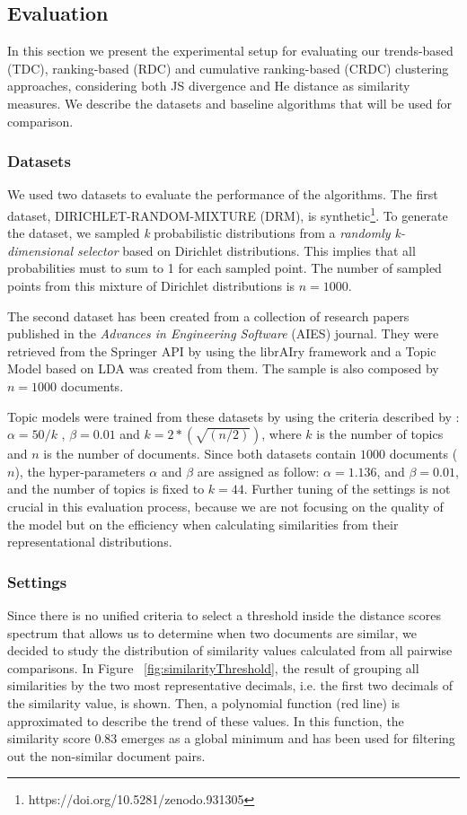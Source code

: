 \subsection{Evaluation}
\label{sec:clustering-experiments}
In this section we present the experimental setup for evaluating our trends-based (TDC), ranking-based (RDC) and cumulative ranking-based (CRDC) clustering approaches, considering both JS divergence and He distance as similarity measures. We describe the datasets and baseline algorithms that will be used for comparison.

\subsubsection{Datasets}
\label{sec:clustering-datasets}
We used two datasets to evaluate the performance of the algorithms. The first dataset, DIRICHLET-RANDOM-MIXTURE (DRM), is synthetic\footnote{https://doi.org/10.5281/zenodo.931305}. To generate the dataset, we sampled \textit{k} probabilistic distributions from a \textit{randomly k-dimensional selector} based on Dirichlet distributions. This implies that all probabilities must to sum to 1 for each sampled point. The number of sampled points from this mixture of Dirichlet distributions is $n=1000$.

The second dataset has been created from a collection of research papers published in the \textit{Advances in Engineering Software} (AIES) journal. They were retrieved from the Springer API by using the librAIry \citep{Badenes-Olmedo2017} framework and a Topic Model based on LDA was created from them. The sample is also composed by $n=1000$ documents.

Topic models were trained from these datasets by using the criteria described by \citep{Steyvers2006}: $\alpha= 50/k$ , $\beta= 0.01$ and $k=2*(\sqrt{(n/2)})$, where $k$ is the number of topics and $n$ is the number of documents. Since both datasets contain $1000$ documents ($n$), the hyper-parameters $\alpha$ and $\beta$ are assigned as follow: $\alpha=1.136$, and $\beta=0.01$, and the number of topics is fixed to $k=44$. Further tuning of the settings is not crucial in this evaluation process, because we are not focusing on the quality of the model but on the efficiency when calculating similarities from their representational distributions.

\subsubsection{Settings}
\label{sec:clustering-threshold}
Since there is no unified criteria to select a threshold inside the distance scores spectrum that allows us to determine when two documents are similar, we decided to study the distribution of similarity values calculated from all pairwise comparisons. In Figure ~\ref{fig:similarityThreshold}, the result of grouping all similarities by the two most representative decimals, i.e. the first two decimals of the similarity value, is shown. Then, a polynomial function (red line) is approximated to describe the trend of these values. In this function, the similarity score $0.83$ emerges as a global minimum and has been used for filtering out the non-similar document pairs.

